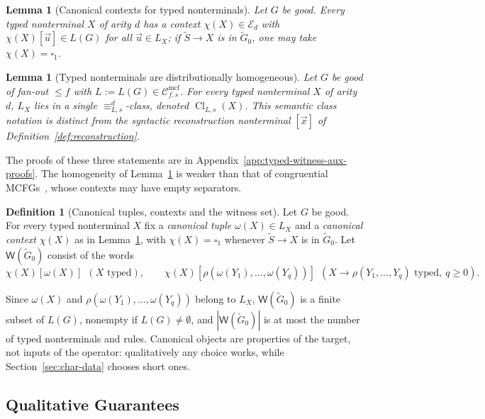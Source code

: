 \documentclass[11pt]{article}
\numberwithin{equation}{section}
\theoremstyle{plain}
\newtheorem{lemma}[theorem]{Lemma}
\theoremstyle{definition}
\newtheorem{definition}[theorem]{Definition}
\theoremstyle{remark}
\newcommand{\Wit}{\mathsf{W}}
\newcommand{\Cmcf}[2]{\mathcal{C}^{\mathrm{mcf}}_{#1,#2}}
\newcommand{\tuple}[1]{\vec{#1}}
\newcommand{\blank}{\square}
\begin{document}
\begin{lemma}[Canonical contexts for typed nonterminals]
\label{lem:identity-canonical-contexts}
Let $G$ be good.  Every typed nonterminal $X$ of arity $d$ has a context
$\chi(X)\in\mathcal E_d$ with $\chi(X)[\tuple u]\in L(G)$ for all
$\tuple u\in L_X$; if $\widetilde S\to X$ is in $\widetilde G_0$, one may take
$\chi(X)=\blank_1$.
\end{lemma}

\begin{lemma}[Typed nonterminals are distributionally homogeneous]
\label{lem:typed-homogeneity}
Let $G$ be good of fan-out $\le f$ with $L:=L(G)\in\Cmcf{f}{s}$.  For every typed nonterminal $X$
of arity $d$, $L_X$ lies in a single $\equiv_{L,s}^d$-class, denoted
$\operatorname{Cl}_{L,s}(X)$.  This semantic class notation is distinct from
the syntactic reconstruction nonterminal $[\tuple x]$ of
Definition~\ref{def:reconstruction}.
\end{lemma}

The proofs of these three statements are in
Appendix~\ref{app:typed-witness-aux-proofs}.  The homogeneity of
Lemma~\ref{lem:typed-homogeneity} is weaker than that of congruential
MCFGs~\cite{ClarkYoshinaka2016}, whose contexts may have empty separators.

\begin{definition}[Canonical tuples, contexts and the witness set]
\label{def:target-canonical}
\label{def:witness-set}
Let $G$ be good.  For every typed nonterminal $X$ fix a \emph{canonical tuple}
$\omega(X)\in L_X$ and a \emph{canonical context} $\chi(X)$ as in
Lemma~\ref{lem:identity-canonical-contexts}, with $\chi(X)=\blank_1$ whenever
$\widetilde S\to X$ is in $\widetilde G_0$.  Let $\Wit(\widetilde G_0)$
consist of the words
\[
 \chi(X)[\omega(X)]\ \ (X\text{ typed}),\qquad
 \chi(X)[\rho(\omega(Y_1),\ldots,\omega(Y_q))]\ \
 (X\to\rho(Y_1,\ldots,Y_q)\text{ typed},\ q\ge0).
\]
\end{definition}

Since $\omega(X)$ and $\rho(\omega(Y_1),\ldots,\omega(Y_q))$ belong to $L_X$,
$\Wit(\widetilde G_0)$ is a finite subset of $L(G)$, nonempty if
$L(G)\ne\emptyset$, and $|\Wit(\widetilde G_0)|$ is at most the number of
typed nonterminals and rules.  Canonical objects are properties of the
target, not inputs of the operator: qualitatively any choice works, while
Section~\ref{sec:char-data} chooses short ones.

\subsection{Qualitative Guarantees}
\label{sec:completeness}
\label{sec:poly-time}
\end{document}
